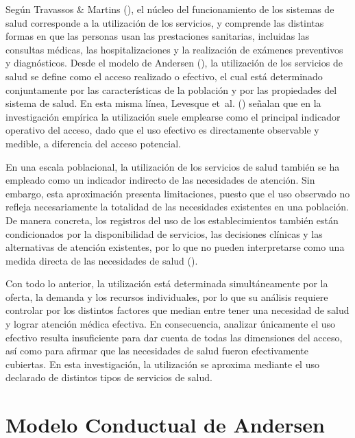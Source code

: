 \documentclass[
  spanish,
  a4paper,
  oneside]{scrbook}
\begin{document}
Según Travassos \& Martins
(), el núcleo del
funcionamiento de los sistemas de salud corresponde a la utilización de
los servicios, y comprende las distintas formas en que las personas usan
las prestaciones sanitarias, incluidas las consultas médicas, las
hospitalizaciones y la realización de exámenes preventivos y
diagnósticos. Desde el modelo de Andersen
(), la utilización de los
servicios de salud se define como el acceso realizado o efectivo, el
cual está determinado conjuntamente por las características de la
población y por las propiedades del sistema de salud. En esta misma
línea, Levesque et~al.
() señalan que en la
investigación empírica la utilización suele emplearse como el principal
indicador operativo del acceso, dado que el uso efectivo es directamente
observable y medible, a diferencia del acceso potencial.

En una escala poblacional, la utilización de los servicios de salud
también se ha empleado como un indicador indirecto de las necesidades de
atención. Sin embargo, esta aproximación presenta limitaciones, puesto
que el uso observado no refleja necesariamente la totalidad de las
necesidades existentes en una población. De manera concreta, los
registros del uso de los establecimientos también están condicionados
por la disponibilidad de servicios, las decisiones clínicas y las
alternativas de atención existentes, por lo que no pueden interpretarse
como una medida directa de las necesidades de salud
().

Con todo lo anterior, la utilización está determinada simultáneamente
por la oferta, la demanda y los recursos individuales, por lo que su
análisis requiere controlar por los distintos factores que median entre
tener una necesidad de salud y lograr atención médica efectiva. En
consecuencia, analizar únicamente el uso efectivo resulta insuficiente
para dar cuenta de todas las dimensiones del acceso, así como para
afirmar que las necesidades de salud fueron efectivamente cubiertas. En
esta investigación, la utilización se aproxima mediante el uso declarado
de distintos tipos de servicios de salud.

\section{Modelo Conductual de
Andersen}\label{modelo-conductual-de-andersen}
\end{document}
